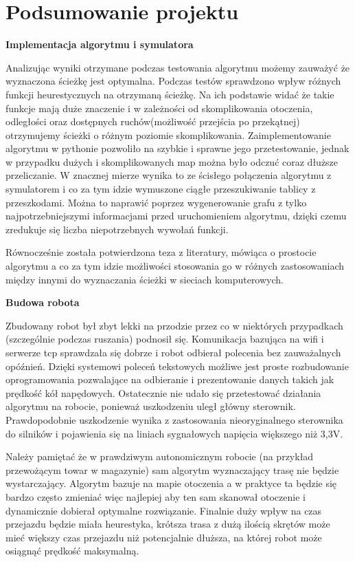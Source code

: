 \section{Podsumowanie projektu}

\textbf{Implementacja algorytmu i symulatora}

Analizując wyniki otrzymane podczas testowania algorytmu możemy zauważyć że wyznaczona 
ścieżkę jest optymalna. Podczas testów sprawdzono wpływ różnych funkcji heurestycznych na otrzymaną ścieżkę.
Na ich podstawie widać że takie funkcje mają duże znaczenie i w zależności od skomplikowania
otoczenia, odległości oraz dostępnych ruchów(możliwość przejścia po przekątnej) otrzymujemy ścieżki o różnym poziomie skomplikowania.
Zaimplementowanie algorytmu w pythonie pozwoliło na szybkie i sprawne jego przetestowanie, jednak w przypadku dużych i skomplikowanych map 
można było odczuć coraz dłuższe przeliczanie. W znacznej mierze wynika to ze ścisłego połączenia algorytmu z symulatorem i co za tym idzie wymuszone 
ciągłe przeszukiwanie tablicy z przeszkodami. Można to naprawić poprzez wygenerowanie grafu z tylko
najpotrzebniejszymi informacjami przed uruchomieniem algorytmu, dzięki czemu zredukuje się liczba niepotrzebnych wywołań funkcji.

Równocześnie została potwierdzona teza z literatury, mówiąca o prostocie algorytmu a co za tym idzie możliwości
stosowania go w różnych zastosowaniach między innymi do wyznaczania ścieżki w sieciach komputerowych.

\textbf{Budowa robota}

Zbudowany robot był zbyt lekki na przodzie przez co w niektórych przypadkach (szczególnie podczas ruszania) podnosił się. Komunikacja bazująca na 
wifi i serwerze tcp sprawdzała się dobrze i robot odbierał polecenia bez zauważalnych opóźnień. Dzięki systemowi poleceń tekstowych możliwe jest 
proste rozbudowanie oprogramowania pozwalające na odbieranie i prezentowanie danych takich jak prędkość kół napędowych. Ostatecznie nie udało się przetestować 
działania algorytmu na robocie, ponieważ uszkodzeniu uległ główny sterownik. Prawdopodobnie uszkodzenie wynika z zastosowania nieoryginalnego 
sterownika do silników i pojawienia się na liniach sygnałowych napięcia większego niż 3,3V. 

Należy pamiętać że w prawdziwym autonomicznym robocie (na przykład przewożącym towar w magazynie) sam algorytm wyznaczający trasę nie będzie wystarczający. 
Algorytm bazuje na mapie otoczenia a w praktyce ta będzie się bardzo często zmieniać więc najlepiej aby ten sam skanował otoczenie
i dynamicznie dobierał optymalne rozwiązanie. Finalnie duży wpływ na czas przejazdu będzie miała heurestyka, krótsza trasa z dużą ilością skrętów może mieć 
większy czas przejazdu niż potencjalnie dłuższa, na której robot może osiągnąć prędkość maksymalną. 